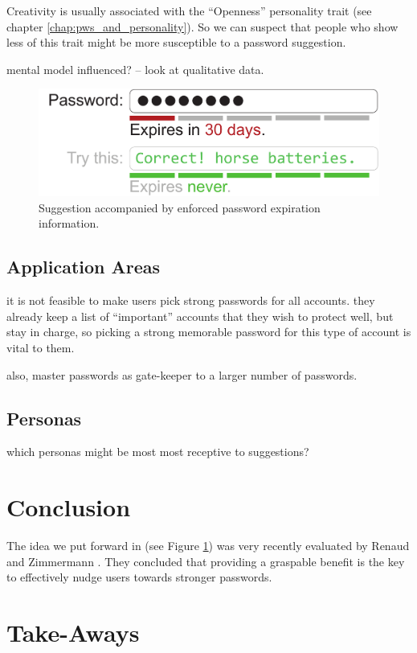 Creativity is usually associated with the ``Openness'' personality trait (see chapter \ref{chap:pws_and_personality}). So we can suspect that people who show less of this trait might be more susceptible to a password suggestion. 

mental model influenced? -- look at qualitative data. 


\begin{figure}
	\centering
	\includegraphics[width=0.7\linewidth]{figures/decoy/expire_mockup}
	\caption{\label{fig:decoy:expiremockup}Suggestion accompanied by enforced password expiration information.}
\end{figure}


\subsection{Application Areas}
it is not feasible to make users pick strong passwords for all accounts.
they already keep a list of ``important'' accounts that they wish to protect well, but stay in charge, so picking a strong memorable password for this type of account is vital to them. 

also, master passwords as gate-keeper to a larger number of passwords. 

\subsection{Personas}
which personas might be most most receptive to suggestions?

\section{Conclusion}

The idea we put forward in \cite{Seitz2016DecoyEffect} (see Figure \ref{fig:decoy:expiremockup}) was very recently evaluated by Renaud and Zimmermann \cite{Renaud2018NudgingFolks}. They concluded that providing a graspable benefit is the key to effectively nudge users towards stronger passwords. 

\section{Take-Aways}



